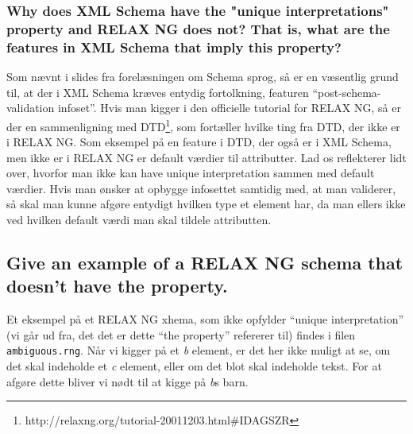\documentclass[a4paper,10pt]{article}
\begin{document}
\subsubsection*{Why does XML Schema have the "unique interpretations" property and RELAX NG does not? That is, what are the features in XML Schema that imply this property?} 
Som nævnt i slides fra forelæsningen om Schema sprog, så er en væsentlig grund til, at der i XML Schema kræves entydig fortolkning, featuren ``post-schema-validation infoset''. Hvis man kigger i den officielle tutorial for RELAX NG, så er der en sammenligning med DTD\footnote{http://relaxng.org/tutorial-20011203.html\#IDAGSZR}, som fortæller hvilke ting fra DTD, der ikke er i RELAX NG. Som eksempel på en feature i DTD, der også er i XML Schema, men ikke er i RELAX NG er default værdier til attributter. Lad os reflekterer lidt over, hvorfor  man ikke kan have unique interpretation sammen med default værdier. Hvis man ønsker at opbygge infosettet samtidig med, at man validerer, så skal man kunne afgøre entydigt hvilken type et element har, da man ellers ikke ved hvilken default værdi man skal tildele attributten.

\subsection*{Give an example of a RELAX NG schema that doesn't have the property.}
Et eksempel på et RELAX NG xhema, som ikke opfylder ``unique interpretation'' (vi går ud fra, det det er dette ``the property'' refererer til) findes i filen \texttt{ambiguous.rng}. Når vi kigger på et \emph{b} element, er det her ikke muligt at se, om det skal indeholde et \emph{c} element, eller om det blot skal indeholde tekst. For at afgøre dette bliver vi nødt til at kigge på \emph{b}s barn.
\end{document}

